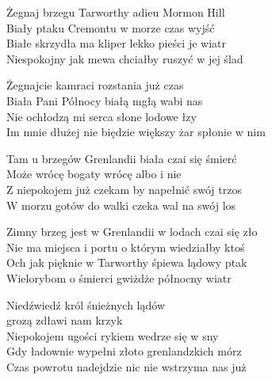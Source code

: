 \begin{text}
    Żegnaj brzegu Tarworthy adieu Mormon Hill\\
    Biały ptaku Cremontu w morze czas wyjść\\
    Białe skrzydła ma kliper lekko pieści je wiatr\\
    Niespokojny jak mewa chciałby ruszyć w jej ślad

    Żegnajcie kamraci rozstania już czas\\
    Biała Pani Północy białą mgłą wabi nas\\
    Nie ochłodzą mi serca słone lodowe łzy\\
    Im mnie dłużej nie biędzie większy żar spłonie w nim

    Tam u brzegów Grenlandii biała czai się śmierć\\
    Może wrócę bogaty wrócę albo i nie\\
    Z niepokojem już czekam by napełnić swój trzos\\
    W morzu gotów do walki czeka wal na swój los

    Zimny brzeg jest w Grenlandii w lodach czai się zło\\
    Nie ma miejsca i portu o którym wiedziałby ktoś\\
    Och jak pięknie w Tarworthy śpiewa lądowy ptak\\
    Wielorybom o śmierci gwiżdże północny wiatr

    Niedźwiedź król śnieżnych lądów\\
    \vin \vin \vin \vin \vin grozą zdławi nam krzyk\\
    Niepokojem ugości rykiem wedrze się w sny\\
    Gdy ładownie wypełni złoto grenlandzkich mórz\\
    Czas powrotu nadejdzie nic nie wstrzyma nas już
\end{text}
